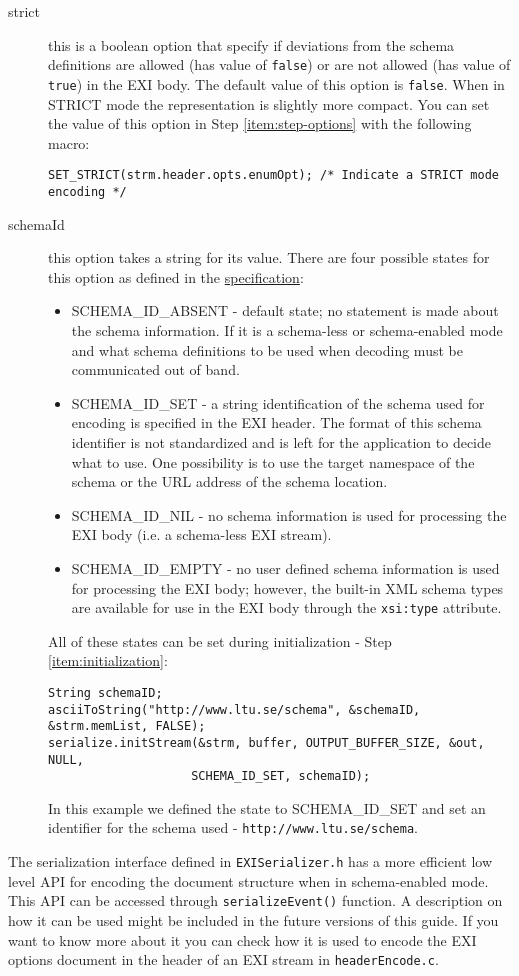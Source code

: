 \begin{description}
 \item[strict] this is a boolean option that specify if deviations from the schema
definitions are allowed (has value of \texttt{false}) or are not allowed (has value of \texttt{true})
in the EXI body. The default value of this option is \texttt{false}. When in STRICT mode
the representation is slightly more compact. You can set the
value of this option in Step \ref{item:step-options} with the following macro:
\begin{lstlisting}
SET_STRICT(strm.header.opts.enumOpt); /* Indicate a STRICT mode encoding */
\end{lstlisting}

 \item[schemaId] this option takes a string for its value. There are four possible states
for this option as defined in the \href{http://www.w3.org/TR/2011/REC-exi-20110310/#key-schemaIdOption}{specification}:
\begin{itemize}
 \item SCHEMA\_ID\_ABSENT - default state; no statement is made about the schema information.
If it is a schema-less or schema-enabled mode and what schema definitions to be used when decoding must be communicated out of band.
 \item SCHEMA\_ID\_SET - a string identification of the schema used for encoding is specified in the EXI header.
The format of this schema identifier is not standardized and is left for the application to decide what to use.
One possibility is to use the target namespace of the schema or the URL address of the schema location.
 \item SCHEMA\_ID\_NIL - no schema information is used for processing the EXI body (i.e. a schema-less EXI stream).
 \item SCHEMA\_ID\_EMPTY - no user defined schema information is used for processing the EXI body; however,
the built-in XML schema types are available for use in the EXI body
through the \texttt{xsi:type} attribute.
\end{itemize}
  All of these states can be set during initialization - Step \ref{item:initialization}:
\begin{lstlisting}
String schemaID;
asciiToString("http://www.ltu.se/schema", &schemaID, &strm.memList, FALSE);
serialize.initStream(&strm, buffer, OUTPUT_BUFFER_SIZE, &out, NULL, 
					SCHEMA_ID_SET, schemaID);                           
\end{lstlisting}
In this example we defined the state to SCHEMA\_ID\_SET and set an identifier for the schema used - \texttt{http://www.ltu.se/schema}.
 \end{description}

The serialization interface defined in \texttt{EXISerializer.h} has a more efficient low level API
for encoding the document structure when in schema-enabled mode. This API can be accessed through \texttt{serializeEvent()}
function. A description on how it can be used might be included in the future versions of this guide. If you want to know more about it
you can check how it is used to encode the EXI options document in the header of an EXI stream in \texttt{headerEncode.c}. 